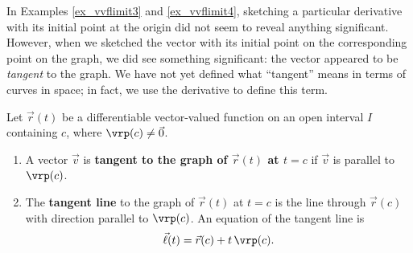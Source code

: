 In Examples \ref{ex_vvflimit3} and \ref{ex_vvflimit4}, sketching a particular derivative with its initial point at the origin did not seem to reveal anything significant. However, when we sketched the vector with its initial point on the corresponding point on the graph, we did see something significant: the vector appeared to be \textit{tangent} to the graph. We have not yet defined what ``tangent'' means in terms of curves in space; in fact, we use the derivative to define this term.

\begin{definition}\label{def:vector_tangent}
Let $\vec r(t)$ be a differentiable vector-valued function on an open interval $I$ containing $c$, where $\vrp(c)\neq \vec 0$.
\begin{enumerate}
	\item A vector $\vec v$ is \textbf{tangent to the graph of $\vec r(t)$ at $t=c$} if $\vec v$ is parallel to $\vrp(c)$.
	\item	The \textbf{tangent line}  to the graph of $\vec r(t)$ at $t=c$ is the line through $\vec r(c)$ with direction parallel to $\vrp(c)$. An equation of the tangent line is 
	\[\vec \ell(t) = \vec r(c) + t\,\vrp(c).\]
\end{enumerate}
\end{definition}


